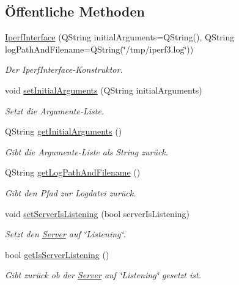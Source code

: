 \subsection*{Öffentliche Methoden}
\begin{DoxyCompactItemize}
\item 
\hyperlink{class_iperf_interface_a29d7d64376a399ce741da79c1a9c544c}{Iperf\+Interface} (Q\+String initial\+Arguments=Q\+String(), Q\+String log\+Path\+And\+Filename=Q\+String(\char`\"{}/tmp/iperf3.\+log\char`\"{}))
\begin{DoxyCompactList}\small\item\em Der Iperf\+Interface-\/\+Konstruktor. \end{DoxyCompactList}\item 
void \hyperlink{class_iperf_interface_a4aa4821c81d91e93afe3f5ae2c24bacf}{set\+Initial\+Arguments} (Q\+String initial\+Arguments)
\begin{DoxyCompactList}\small\item\em Setzt die Argumente-\/\+Liste. \end{DoxyCompactList}\item 
Q\+String \hyperlink{class_iperf_interface_a93b05412f77de1fc4cb57e5b03f378dd}{get\+Initial\+Arguments} ()
\begin{DoxyCompactList}\small\item\em Gibt die Argumente-\/\+Liste als String zurück. \end{DoxyCompactList}\item 
Q\+String \hyperlink{class_iperf_interface_a62e1dad7ad79df8307384b76a14f6eed}{get\+Log\+Path\+And\+Filename} ()
\begin{DoxyCompactList}\small\item\em Gibt den Pfad zur Logdatei zurück. \end{DoxyCompactList}\item 
void \hyperlink{class_iperf_interface_a012e33d4dcb33373c302cf1282b3056b}{set\+Server\+Is\+Listening} (bool server\+Is\+Listening)
\begin{DoxyCompactList}\small\item\em Setzt den \hyperlink{class_server}{Server} auf \char`\"{}\+Listening\char`\"{}. \end{DoxyCompactList}\item 
bool \hyperlink{class_iperf_interface_a68b6291bcbf2ad413f4efa00ebf9b66d}{get\+Is\+Server\+Listening} ()
\begin{DoxyCompactList}\small\item\em Gibt zurück ob der \hyperlink{class_server}{Server} auf \char`\"{}\+Listening\char`\"{} gesetzt ist. \end{DoxyCompactList}\item 

\end{DoxyCompactItemize}
